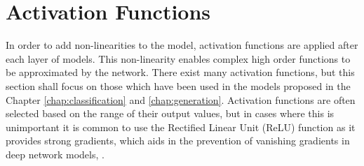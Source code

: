 \section{Activation Functions}
In order to add non-linearities to the model, activation functions are applied after each layer of models.
This non-linearity enables complex high order functions to be approximated by the network.
There exist many activation functions, but this section shall focus on those which have been used in the models proposed in the Chapter \ref{chap:classification} and \ref{chap:generation}.
Activation functions are often selected based on the range of their output values, but in cases where this is unimportant it is common to use the Rectified Linear Unit (ReLU) function as it provides strong gradients, which aids in the prevention of vanishing gradients in deep network models, \cite{Goodfellow-et-al-2016}.


